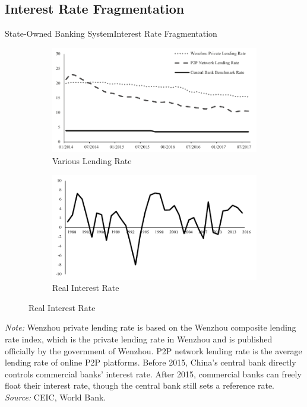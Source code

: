 \documentclass{beamer}
\begin{document}
\subsection{Interest Rate Fragmentation}

\begin{frame}{State-Owned Banking System}{Interest Rate Fragmentation}
\begin{figure}
\centering
\begin{subfigure}{.5\textwidth}
  \centering
  \includegraphics[scale=.45]{fig/lrate.pdf}
  \caption{\footnotesize{Various Lending Rate}}
\end{subfigure}%
\begin{subfigure}{.5\textwidth}
  \centering
  \includegraphics[scale=.4]{fig/realr.pdf}
  \caption{\footnotesize{Real Interest Rate}}
\end{subfigure}
\end{figure}
\tiny
\emph{Note: } 
Wenzhou private lending rate is based on the Wenzhou composite lending rate index,
which is the private lending rate in Wenzhou and is published officially by the 
government of Wenzhou. 
P2P network lending rate is the average lending rate of online P2P platforms. 
Before 2015, China's central bank directly controls commercial banks' interest rate.
After 2015, commercial banks can freely float their interest rate, though the 
central bank still sets a reference rate.\\
\emph{Source: } 
CEIC, World Bank.
\end{frame}
\end{document}
